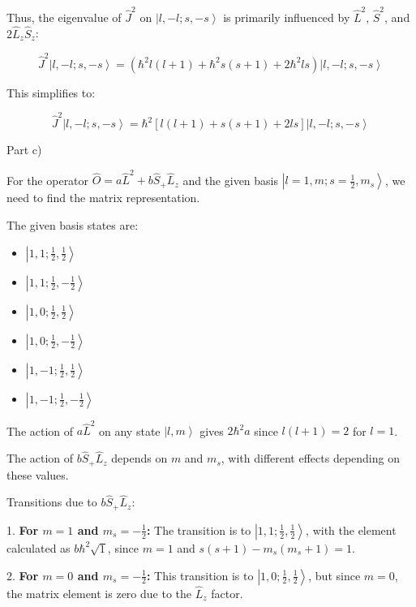 \documentclass[a4paper,11pt]{article}
\begin{document}
Thus, the eigenvalue of \( \hat{J}^2 \) on \( \left|l, -l; s, -s \right> \) is primarily influenced by \( \hat{L}^2 \), \( \hat{S}^2 \), and \( 2\hat{L}_{z}\hat{S}_{z} \):

\[
\hat{J}^2\left|l, -l; s, -s \right> = (\hbar^2 l(l+1) + \hbar^2 s(s+1) + 2\hbar^2 ls)\left|l, -l; s, -s \right>
\]

This simplifies to:

\[
\hat{J}^2\left|l, -l; s, -s \right> = \hbar^2 [l(l+1) + s(s+1) + 2ls]\left|l, -l; s, -s \right>
\]

Part c)

For the operator \( \hat{O} = a\hat{L}^2 + b\hat{S}_{+}\hat{L}_{z} \) and the given basis \( \left|l=1, m; s=\frac{1}{2}, m_{s} \right> \), we need to find the matrix representation.

The given basis states are:

\begin{itemize}
    \item \( \left|1, 1; \frac{1}{2}, \frac{1}{2} \right> \)
    \item \( \left|1, 1; \frac{1}{2}, -\frac{1}{2} \right> \)
    \item \( \left|1, 0; \frac{1}{2}, \frac{1}{2} \right> \)
    \item \( \left|1, 0; \frac{1}{2}, -\frac{1}{2} \right> \)
    \item \( \left|1, -1; \frac{1}{2}, \frac{1}{2} \right> \)
    \item \( \left|1, -1; \frac{1}{2}, -\frac{1}{2} \right> \)
\end{itemize}

The action of \( a\hat{L}^2 \) on any state \( \left|l, m \right> \) gives \( 2\hbar^2a \) since \( l(l+1) = 2 \) for \( l=1 \).

The action of \( b\hat{S}_{+}\hat{L}_{z} \) depends on \( m \) and \( m_{s} \), with different effects depending on these values.

Transitions due to \( b\hat{S}_{+}\hat{L}_{z} \):

1. \textbf{For \( m = 1 \) and \( m_{s} = -\frac{1}{2} \):} The transition is to \( \left|1, 1; \frac{1}{2}, \frac{1}{2} \right> \), with the element calculated as \( b\hbar^2 \sqrt{1} \), since \( m = 1 \) and \( s(s+1) - m_{s}(m_{s}+1) = 1 \).

2. \textbf{For \( m = 0 \) and \( m_{s} = -\frac{1}{2} \):} This transition is to \( \left|1, 0; \frac{1}{2}, \frac{1}{2} \right> \), but since \( m = 0 \), the matrix element is zero due to the \( \hat{L}_{z} \) factor.
\end{document}
